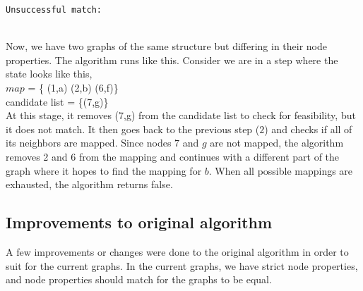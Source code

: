 \texttt{Unsuccessful match:}\\\\
    \label{tikz}

Now, we have two graphs of the same structure but differing in their node properties. The algorithm runs like this. 
Consider we are in a step where the state looks like this, \\
$map$ = \{ (1,a) (2,b) (6,f)\}\\
candidate list  = \{(7,g)\} \\

At this stage, it removes (7,g) from the candidate list to check for feasibility, but it does not match. It then goes back to the previous step ($2$) and checks if all of its neighbors are mapped. Since nodes $7$ and $g$ are not mapped, the algorithm removes 2 and 6 from the mapping and continues with a different part of the graph where it hopes to find the mapping for $b$. When all possible mappings are exhausted, the algorithm returns false. 

\subsection{Improvements to original algorithm}
A few improvements or changes were done to the original algorithm in order to suit for the current graphs. In the current graphs, we have strict node properties, and node properties should match for the graphs to be equal. 

